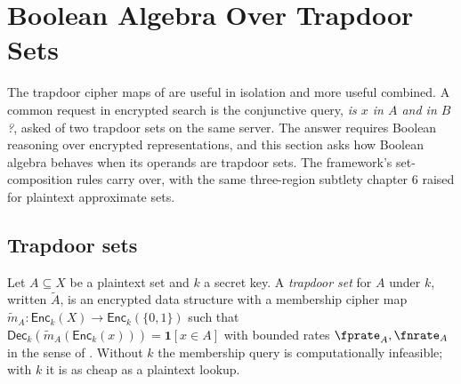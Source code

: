 %
%
%

\section{Boolean Algebra Over Trapdoor Sets}
\label{sec:boolean-trapdoor}

The trapdoor cipher maps of  are useful in
isolation and more useful combined. A common request in encrypted search
is the conjunctive query, \emph{is $x$ in $A$ and in $B$?}, asked of two
trapdoor sets on the same server. The answer requires Boolean reasoning
over encrypted representations, and this section asks how Boolean algebra
behaves when its operands are trapdoor sets. The framework's
set-composition rules carry over, with the same three-region subtlety
chapter 6 raised for plaintext approximate sets.

\subsection*{Trapdoor sets}

\begin{definition}
\label{def:trapdoor-set}
Let $A \subseteq X$ be a plaintext set and $k$ a secret key. A
\emph{trapdoor set} for $A$ under $k$, written $\tilde A$, is an
encrypted data structure with a membership cipher map $\tilde m_A :
\mathsf{Enc}_k(X) \to \mathsf{Enc}_k(\{0,1\})$ such that
$\mathsf{Dec}_k(\tilde m_A(\mathsf{Enc}_k(x))) = \mathbf{1}[x \in A]$ with
bounded rates $\fprate_A, \fnrate_A$ in the sense of
. Without $k$ the membership query is
computationally infeasible; with $k$ it is as cheap as a plaintext
lookup.
\end{definition}

